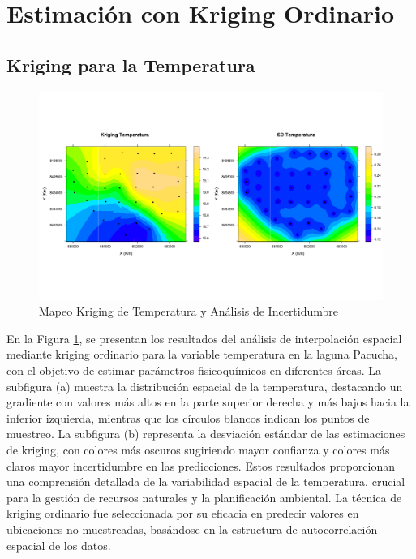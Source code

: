  
\section{Estimación con Kriging Ordinario}
\subsection{Kriging para la Temperatura}

\begin{figure}[!htb]
    \centering
    \includegraphics[width=1\linewidth]{Figuras_AED/ESTIMACION/Temperatura_KRIGING.pdf}
    \caption{Mapeo Kriging de Temperatura y Análisis de Incertidumbre}
    \label{fig:enter-labelest}
\end{figure}

En la Figura \ref{fig:enter-labelest}, se presentan los resultados del análisis de interpolación espacial mediante kriging ordinario para la variable temperatura en la laguna Pacucha, con el objetivo de estimar parámetros fisicoquímicos en diferentes áreas. La subfigura (a) muestra la distribución espacial de la temperatura, destacando un gradiente con valores más altos en la parte superior derecha y más bajos hacia la inferior izquierda, mientras que los círculos blancos indican los puntos de muestreo. La subfigura (b) representa la desviación estándar de las estimaciones de kriging, con colores más oscuros sugiriendo mayor confianza y colores más claros mayor incertidumbre en las predicciones. Estos resultados proporcionan una comprensión detallada de la variabilidad espacial de la temperatura, crucial para la gestión de recursos naturales y la planificación ambiental. La técnica de kriging ordinario fue seleccionada por su eficacia en predecir valores en ubicaciones no muestreadas, basándose en la estructura de autocorrelación espacial de los datos.


